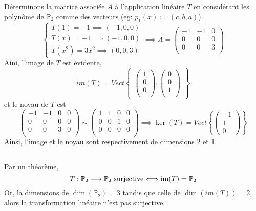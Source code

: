 \subsection{}
Déterminons la matrice associée $A$ à l'application linéaire $T$ en considérant les polynôme de $\mathbb{P}_2$ comme des vecteurs (eg: $p_1(x):=(c,b,a)$).
\[\begin{cases}
T(1)=-1\implies (-1,0,0)\\
T(x)=-1\implies (-1,0,0)\\
T(x^2)=3x^2\implies (0,0,3)
\end{cases}\implies A=
\begin{pmatrix}
-1 & -1 & 0 \\
0 & 0 & 0 \\
0 & 0 & 3 \\
\end{pmatrix}\]
Aini, l'image de $T$ est évidente,\[im(T)=Vect
\begin{Bmatrix}
\left(
\begin{array}{c}
1 \\
0 \\
0 \\
\end{array}
\right),\left(
\begin{array}{c}
0 \\
0 \\
1 \\
\end{array}
\right)
\end{Bmatrix}\]
et le noyau de $T$ est 
\[\left(
\begin{array}{ccc|c}
-1 & -1 & 0 & 0 \\
0 & 0 & 0 & 0 \\
0 & 0 & 3 & 0 \\
\end{array}
\right)\sim\left(
\begin{array}{cccc}
1 & 1 & 0 & 0 \\
0 & 0 & 1 & 0 \\
0 & 0 & 0 & 0 \\
\end{array}
\right)\implies\ker(T)=Vect\left\{\begin{pmatrix}
-1\\1\\0
\end{pmatrix}\right\}\]
Ainsi, l'image et le noyau sont respectivement de dimensions 2 et 1.
\subsection{}
Par un théorème,
	\[T:\mathbb{P}_2\longrightarrow\mathbb{P}_2\text{\normalfont{ surjective}}\Longleftrightarrow\text{\normalfont{im}}(T)=\mathbb{P}_2\]
Or, la dimensions de $\dim(\mathbb{P}_2)=3$ tandis que celle de $\dim(im(T))=2$, alors la transformation linéaire n'est pas surjective.
